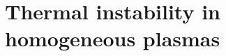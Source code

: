 \chapter{Thermal instability in homogeneous plasmas} \label{ch: thermal instability}


\cleardoublepage
